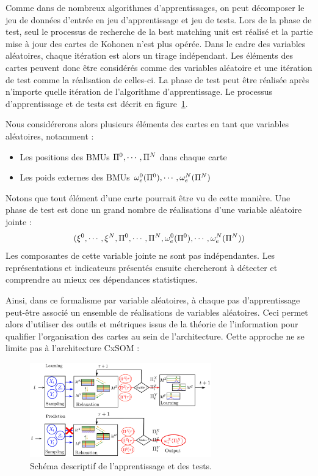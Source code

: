 Comme dans de nombreux algorithmes d'apprentissages, on peut décomposer le jeu de données d'entrée en jeu d'apprentissage et jeu de tests. Lors de la phase de test, seul le processus de recherche de la best matching unit est réalisé et la partie mise à jour des cartes de Kohonen n'est plus opérée. Dans le cadre des variables aléatoires, chaque itération est alors un tirage indépendant. Les éléments des cartes peuvent donc être considérés comme des variables aléatoire et une itération de test comme la réalisation de celles-ci. La phase de test peut être réalisée après n'importe quelle itération de l'algorithme d'apprentissage. Le processus d'apprentissage et de tests est décrit en figure~\ref{fig:flowchart}.

Nous considérerons alors plusieurs éléments des cartes en tant que variables aléatoires, notamment :  
\begin{itemize}
\item Les positions des BMUs $\Pi^0, \cdots, \Pi^N$ dans chaque carte
\item Les poids externes des BMUs $\omega_e^0(\Pi^0), \cdots, \omega_e^N(\Pi^N)$
\end{itemize}
Notons que tout élément d'une carte pourrait être vu de cette manière. 
Une phase de test est donc un grand nombre de réalisations d'une variable aléatoire jointe : 
$$(\xi^0, \cdots, \xi^N, \Pi^0, \cdots, \Pi^N, \omega_e^0(\Pi^0), \cdots, \omega_e^N(\Pi^N))$$
Les composantes de cette variable jointe ne sont pas indépendantes. Les représentations et indicateurs présentés ensuite chercheront à détecter et comprendre au mieux ces dépendances statistiques.

Ainsi, dans ce formalisme par variable aléatoires, à chaque pas d'apprentissage peut-être associé un ensemble de réalisations de variables aléatoires. Ceci permet alors d'utiliser des outils et métriques issus de la théorie de l'information pour qualifier l'organisation des cartes au sein de l'architecture. Cette approche ne se limite pas à l'architecture CxSOM : 

\begin{figure}
\centering
\includegraphics[width=0.7\textwidth]{learning_tests.pdf}
\caption{Schéma descriptif de l'apprentissage et des tests.}
\label{fig:flowchart}
\end{figure}


